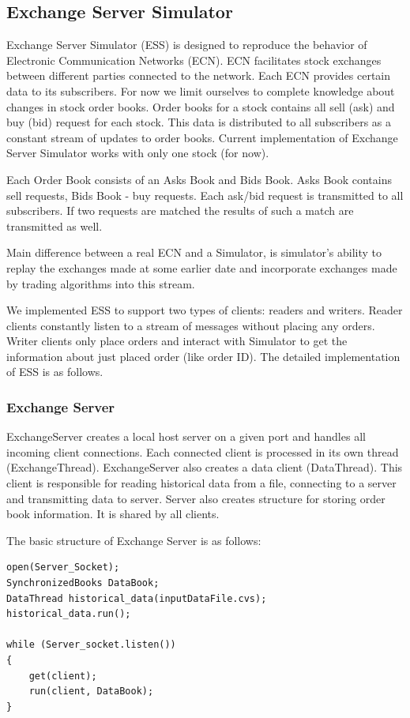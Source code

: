 \documentclass[14pt]{article}
\begin{document}
\subsection{Exchange Server Simulator}
Exchange Server Simulator (ESS) is designed to reproduce the behavior of Electronic Communication Networks (ECN). ECN facilitates stock exchanges between different parties connected to the network. Each ECN provides certain data to its subscribers. For now we limit ourselves to complete knowledge about changes in stock order books. Order books for a stock contains all sell (ask) and buy (bid) request for each stock. This data is distributed to all subscribers as a constant stream of updates to order books. Current implementation of Exchange Server Simulator works with only one stock (for now). 

Each Order Book consists of an Asks Book and Bids Book. Asks Book contains sell requests, Bids Book - buy requests. Each ask/bid request is transmitted to all subscribers. If two requests are matched the results of such a match are transmitted as well. 

Main difference between a real ECN and a Simulator, is simulator's ability to replay the exchanges made at some earlier date and incorporate exchanges made by trading algorithms into this stream. 

We implemented ESS to support two types of clients: readers and writers. Reader clients constantly listen to a stream of messages without placing any orders. Writer clients only place orders and interact with Simulator to get the information about just placed order (like order ID). The detailed implementation of ESS is as follows.

\subsubsection{Exchange Server}
ExchangeServer creates a local host server on a given port and handles all incoming client connections. Each connected client is processed in its own thread (ExchangeThread). ExchangeServer also creates a data client (DataThread). This client is responsible for reading historical data from a file, connecting to a server and transmitting data to server. Server also creates structure for storing order book information. It is shared by all clients.

\noindent The basic structure of Exchange Server is as follows:
\begin{verbatim}
open(Server_Socket);
SynchronizedBooks DataBook;
DataThread historical_data(inputDataFile.cvs);
historical_data.run();

while (Server_socket.listen())
{
    get(client);
    run(client, DataBook);
}
\end{verbatim}
\end{document}
